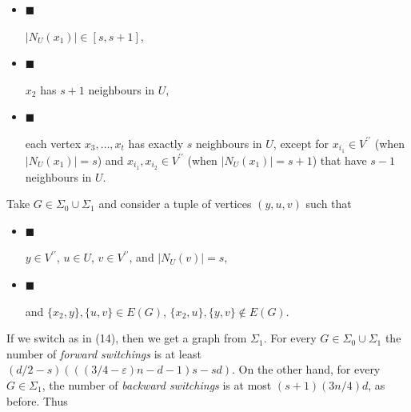 \begin{itemize}


\item[] 
$\blacksquare$ 


$|N_{U}(x_{1})|\in[s,s+1]$,\par





\item[] 
$\blacksquare$ 


$x_{2}$ has $s+1$ neighbours in $U$,\par





\item[] 
$\blacksquare$ 


each vertex $x_{3},\ldots,x_{t}$ has exactly $s$ neighbours in $U$, except for $x_{i_{1}}\in V^{\prime\prime}$ (when $|N_{U}(x_{1})|=s$) and $x_{i_{1}},x_{i_{2}}\in V^{\prime\prime}$ (when $|N_{U}(x_{1})|=s+1$) that have $s-1$ neighbours in $U$.\par





\end{itemize}


Take $G\in\Sigma_{0}\cup\Sigma_{1}$ and consider a tuple of vertices $(y,u,v)$ such that\par


\begin{itemize}


\item[] 
$\blacksquare$ 


$y\in V^{\prime\prime}$, $u\in U$, $v\in V^{\prime\prime}$, and $|N_{U}(v)|=s$,\par





\item[] 
$\blacksquare$ 


and $\{x_{2},y\},\{u,v\}\in E(G)$, $\{x_{2},u\},\{y,v\}\notin E(G)$.\par





\end{itemize}


If we switch as in (14), then
we get a graph from $\Sigma_{1}$. For every $G\in\Sigma_{0}\cup\Sigma_{1}$ the number of \emph{forward switchings} is at least $(d/2-s)(((3/4-\varepsilon)n-d-1)s-sd)$. On the other hand, for every $G\in\Sigma_{1}$, the number of \emph{backward switchings} is at most $(s+1)(3n/4)d$, as before. Thus\par


